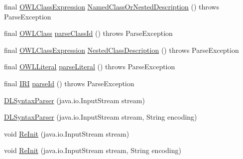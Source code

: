 \begin{DoxyCompactItemize}
\item 
final \hyperlink{interfaceorg_1_1semanticweb_1_1owlapi_1_1model_1_1_o_w_l_class_expression}{O\-W\-L\-Class\-Expression} \hyperlink{classuk_1_1ac_1_1manchester_1_1cs_1_1owlapi_1_1dlsyntax_1_1parser_1_1_d_l_syntax_parser_a446a9d21615493cea2befa4d2a4598a4}{Named\-Class\-Or\-Nested\-Description} ()  throws Parse\-Exception 
\item 
final \hyperlink{interfaceorg_1_1semanticweb_1_1owlapi_1_1model_1_1_o_w_l_class}{O\-W\-L\-Class} \hyperlink{classuk_1_1ac_1_1manchester_1_1cs_1_1owlapi_1_1dlsyntax_1_1parser_1_1_d_l_syntax_parser_aa3edf6496eccb87e28c46562ebf50736}{parse\-Class\-Id} ()  throws Parse\-Exception 
\item 
final \hyperlink{interfaceorg_1_1semanticweb_1_1owlapi_1_1model_1_1_o_w_l_class_expression}{O\-W\-L\-Class\-Expression} \hyperlink{classuk_1_1ac_1_1manchester_1_1cs_1_1owlapi_1_1dlsyntax_1_1parser_1_1_d_l_syntax_parser_a79de9193e01ced52031452a00211f0da}{Nested\-Class\-Description} ()  throws Parse\-Exception 
\item 
final \hyperlink{interfaceorg_1_1semanticweb_1_1owlapi_1_1model_1_1_o_w_l_literal}{O\-W\-L\-Literal} \hyperlink{classuk_1_1ac_1_1manchester_1_1cs_1_1owlapi_1_1dlsyntax_1_1parser_1_1_d_l_syntax_parser_a81896d9343946f407d3180019f819f77}{parse\-Literal} ()  throws Parse\-Exception 
\item 
final \hyperlink{classorg_1_1semanticweb_1_1owlapi_1_1model_1_1_i_r_i}{I\-R\-I} \hyperlink{classuk_1_1ac_1_1manchester_1_1cs_1_1owlapi_1_1dlsyntax_1_1parser_1_1_d_l_syntax_parser_afdfe437fd35c3654830b2abf97619aff}{parse\-Id} ()  throws Parse\-Exception 
\item 
\hyperlink{classuk_1_1ac_1_1manchester_1_1cs_1_1owlapi_1_1dlsyntax_1_1parser_1_1_d_l_syntax_parser_aefe1776544a50ddbde839a2c8b42db9c}{D\-L\-Syntax\-Parser} (java.\-io.\-Input\-Stream stream)
\item 
\hyperlink{classuk_1_1ac_1_1manchester_1_1cs_1_1owlapi_1_1dlsyntax_1_1parser_1_1_d_l_syntax_parser_ad386f4fedccf3d3ed1aa6ab65c6aadf7}{D\-L\-Syntax\-Parser} (java.\-io.\-Input\-Stream stream, String encoding)
\item 
void \hyperlink{classuk_1_1ac_1_1manchester_1_1cs_1_1owlapi_1_1dlsyntax_1_1parser_1_1_d_l_syntax_parser_ac4b9d19c30c6fc251b57178148e61574}{Re\-Init} (java.\-io.\-Input\-Stream stream)
\item 
void \hyperlink{classuk_1_1ac_1_1manchester_1_1cs_1_1owlapi_1_1dlsyntax_1_1parser_1_1_d_l_syntax_parser_abeaa1dd497b573232b4a55aa9a521997}{Re\-Init} (java.\-io.\-Input\-Stream stream, String encoding)

\end{DoxyCompactItemize}
